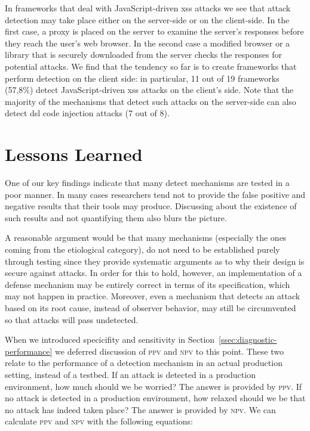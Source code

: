 \documentclass[conference]{IEEEtran}
\begin{document}
In frameworks that deal with JavaScript-driven {\sc xss} attacks we
see that attack detection may take place either on the server-side or
on the client-side. In the first case, a proxy is placed on the server
to examine the server's responses before they reach the user's web
browser. In the second case a modified browser or a library that is
securely downloaded from the server checks the responses for potential
attacks. We find that the tendency so far is to create frameworks that
perform detection on the client side: in particular, 11 out of 19
frameworks (57,8\%) detect JavaScript-driven {\sc xss} attacks on the
client's side. Note that the majority of the mechanisms that detect
such attacks on the server-side can also detect {\sc dsl} code
injection attacks (7 out of 8).

\section{Lessons Learned}
\label{sec:lessons-learned}


One of our key findings indicate that many detect mechanisms are
tested in a poor manner. In many cases researchers tend not to provide
the false positive and negative results that their tools may produce.
Discussing about the existence of such results and not quantifying
them also blurs the picture.

A reasonable argument would be that many mechanisms (especially the
ones coming from the etiological category), do not need to be
established purely through testing since they provide systematic
arguments as to why their design is secure against attacks. In order
for this to hold, however, an implementation of a defense mechanism
may be entirely correct in terms of its specification, which may not
happen in practice. Moreover, even a mechanism that detects an attack
based on its root cause, instead of observer behavior, may still be
circumvented so that attacks will pass undetected.

When we introduced specicifity and sensitivity in
Section~\ref{ssec:diagnostic-performance} we deferred discussion of
\textsc{ppv} and \textsc{npv} to this point. These two relate to the
performance of a detection mechanism in an actual production setting,
instead of a testbed. If an attack is detected in a production
environment, how much should we be worried? The answer is provided by
\textsc{ppv}. If no attack is detected in a production environment,
how relaxed should we be that no attack has indeed taken place? The
answer is provided by \textsc{npv}. We can calculate \textsc{ppv} and
\textsc{npv} with the following equations:
\end{document}
